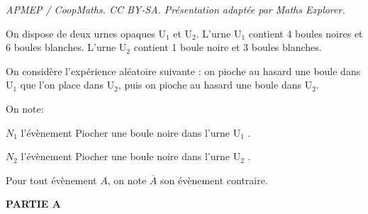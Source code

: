 \documentclass[10pt]{article}
\begin{document}
\noindent\textit{APMEP / CoopMaths. CC BY-SA. Présentation adaptée par Maths Explorer.}\par\medskip
\medskip

On dispose de deux urnes opaques U$_1$ et U$_2$.
L'urne U$_1$ contient 4 boules noires et 6 boules blanches.
L'urne U$_2$ contient 1 boule noire et 3 boules blanches.

On considère l'expérience aléatoire suivante :
on pioche au hasard une boule dans U$_1$ que l'on place dans U$_2$, puis on pioche au hasard une boule dans U$_2$.

\begin{list}{\textbullet}{On note:}
\item $N_1$ l'évènement \og Piocher une boule noire dans l'urne U$_1$ \fg.
\item $N_2$ l'évènement \og Piocher une boule noire dans l'urne U$_2$ \fg.
\end{list}

Pour tout évènement $A$, on note $\overline{A}$ son évènement contraire.

\bigskip

\textbf{PARTIE A}

\medskip
\end{document}
